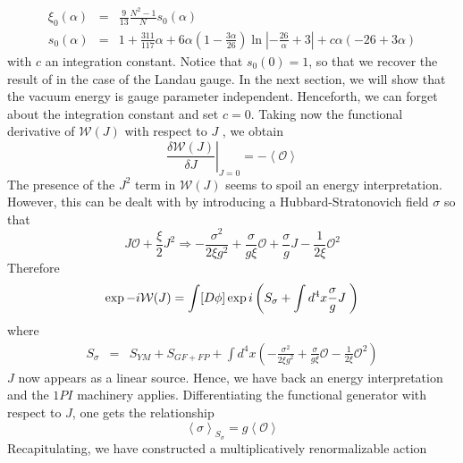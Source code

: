 \documentclass[a4paper,12pt]{article}
\begin{document}
\begin{eqnarray}  \label{d6}
\xi_{0}(\alpha)&=&\frac{9}{13}\frac{N^{2}-1}{N}s_{0}(\alpha) \\
s_{0}(\alpha)&=&1+\frac{311}{117}\alpha+6\alpha\left(1-\frac{3\alpha}{26}%
\right)\ln\left|-\frac{26}{\alpha}+3\right|+c\alpha(-26+3\alpha)
\end{eqnarray}
with $c$ an integration constant. Notice that $s_{0}(0)=1$, so that we
recover the result of \cite{v1} in the case of the Landau gauge. In the next
section, we will show that the vacuum energy is gauge parameter independent.
Henceforth, we can forget about the integration constant and set $c=0$.
\newline
\newline
Taking now the functional derivative of $\mathcal{W}(J)$ with respect to $J$%
, we obtain
\begin{equation}
\left. \frac{\delta \mathcal{W}(J)}{\delta J}\right| _{J=0}=-\left\langle%
\mathcal{O}\right\rangle  \label{fd}
\end{equation}
The presence of the $J^{2}$ term in $\mathcal{W}(J)$ seems to spoil an
energy interpretation. However, this can be dealt with by introducing a
Hubbard-Stratonovich field $\sigma$ so that
\begin{equation}
J\mathcal{O}+\frac{\xi }{2}J^{2}\Rightarrow -\frac{\sigma ^{2}}{2\xi g^{2}}+%
\frac{\sigma }{g\xi}\mathcal{O}+\frac{\sigma }{g}J-\frac{1}{2\xi }\mathcal{O}%
^{2}  \label{hs}
\end{equation}
Therefore
\begin{equation}
\exp -i\mathcal{W}(J)=\int [D\phi ]\exp i\left( S_{\sigma }+\int d^{4}x\frac{%
\sigma }{g}J\;\right)  \label{wjs}
\end{equation}
where
\begin{eqnarray}
S_{\sigma } &=&S_{YM}+S_{GF+FP}+\int d^{4}x\left( -\frac{\sigma ^{2}}{2\xi
g^{2}}+\frac{\sigma }{g\xi}\mathcal{O} - \frac{1}{2\xi } \mathcal{O}
^{2}\right)  \label{ss}
\end{eqnarray}
$J$ now appears as a linear source. Hence, we have back an energy
interpretation and the $1PI$ machinery applies. \newline
\newline
Differentiating the functional generator with respect to $J$, one gets the
relationship
\begin{equation}
\left\langle \sigma \right\rangle _{S_{\sigma }}=g\left\langle \mathcal{O}%
\right\rangle  \label{rel}
\end{equation}
Recapitulating, we have constructed a multiplicatively renormalizable action
\end{document}

